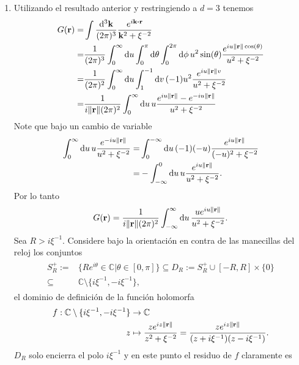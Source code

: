 \documentclass{article}
\begin{document}
\begin{enumerate}
\item Utilizando el resultado anterior y restringiendo a $d=3$ tenemos 
\begin{align}
\begin{split}
G(\vb{r})=&\int\frac{\dd[3]{\vb{k}}}{(2\pi)^3}\frac{e^{i\vb{k}\vdot\vb{r}}}{\vb{k}^2+\xi^{-2}}\\
=&\frac{1}{(2\pi)^3}\int_0^\infty\dd{u}\int_0^\pi\dd{\theta}\int_0^{2\pi}\dd{\phi}u^2\sin(\theta)\frac{e^{iu\|\vb{r}\|\cos(\theta)}}{u^2+\xi^{-2}}\\
=&\frac{1}{(2\pi)^2}\int_0^\infty\dd{u}\int_1^{-1}\dd{v}(-1)u^2\frac{e^{iu\|\vb{r}\|v}}{u^2+\xi^{-2}}\\
=&\frac{1}{i\|\vb{r}\|(2\pi)^2}\int_0^\infty\dd{u}u\frac{e^{iu\|\vb{r}\|}-e^{-iu\|\vb{r}\|}}{u^2+\xi^{-2}}
\end{split}
\end{align}
Note que bajo un cambio de variable
\begin{align}
\begin{split}
\int_0^\infty\dd{u}u\frac{e^{-iu\|\vb{r}\|}}{u^2+\xi^{-2}}=&\int_0^{-\infty}\dd{u}(-1)(-u)\frac{e^{iu\|\vb{r}\|}}{(-u)^2+\xi^{-2}}\\
=&-\int_{-\infty}^0\dd{u}u\frac{e^{iu\|\vb{r}\|}}{u^2+\xi^{-2}}.
\end{split}
\end{align}
Por lo tanto
\begin{equation}
G(\vb{r})=\frac{1}{i\|\vb{r}\|(2\pi)^2}\int_{-\infty}^\infty\dd{u}\frac{ue^{iu\|\vb{r}\|}}{u^2+\xi^{-2}}.
\end{equation}
Sea $R>i\xi^{-1}$. Considere bajo la orientación en contra de las manecillas del reloj los conjuntos 
\begin{align}
\begin{split}
S^+_R:=&\{Re^{i\theta}\in\mathbb{C}|\theta\in[0,\pi]\}\subseteq D_R:=S^+_R\cup[-R,R]\times\{0\}\\
\subseteq&\mathbb{C}\setminus\{i\xi^{-1},-i\xi^{-1}\},
\end{split}
\end{align}
el dominio de definición de la función holomorfa
\begin{align}
\begin{split}
f:\mathbb{C}\setminus\{i\xi^{-1},-i\xi^{-1}\}&\rightarrow\mathbb{C}\\
z&\mapsto \frac{ze^{iz\|\vb{r}\|}}{z^2+\xi^{-2}}=\frac{ze^{iz\|\vb{r}\|}}{(z+i\xi^{-1})(z-i\xi^{-1})}.
\end{split}
\end{align}
$D_R$ solo encierra el polo $i\xi^{-1}$ y en este punto el residuo de $f$ claramente es

\end{enumerate}
\end{document}
